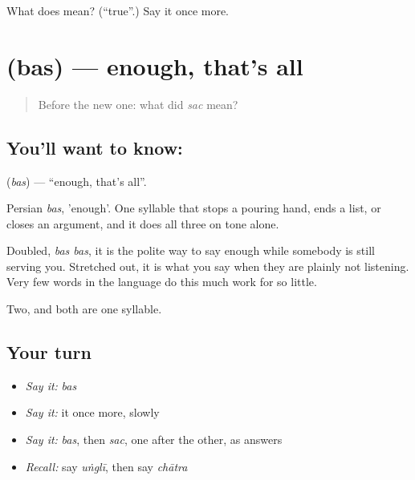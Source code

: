 \begin{tcolorbox}[breakable,colback=teal!4,colframe=teal!35!black,title={Before you move on}]
What does  mean? (\textquotedblleft{}true\textquotedblright{}.) Say it once more.
\end{tcolorbox}
\section[\texorpdfstring{\hi{बस} (bas)}{बस (bas)}]{ (bas) — enough, that's all}

\label{lesson:HI-C48-enough}



\begin{quote}
Before the new one: what did \emph{sac} mean?
\end{quote}

\subsection*{You'll want to know: }
\textbf{} (\emph{bas}) — \textquotedblleft{}enough, that's all\textquotedblright{}.

Persian \emph{bas}, 'enough'. One syllable that stops a pouring hand, ends a list, or closes an argument, and it does all three on tone alone.

Doubled, \emph{bas bas}, it is the polite way to say enough while somebody is still serving you. Stretched out, it is what you say when they are plainly not listening. Very few words in the language do this much work for so little.

\begin{grammarlens}[title={What you've built}]
Two, and both are one syllable.
\end{grammarlens}

\subsection*{Your turn}
\begin{itemize}
\raggedright
  \item \emph{Say it:} \emph{bas}
  \item \emph{Say it:} it once more, slowly
  \item \emph{Say it:} \emph{bas}, then \emph{sac}, one after the other, as answers
  \item \emph{Recall:} say \emph{uṅglī}, then say \emph{chātra}
\end{itemize}


